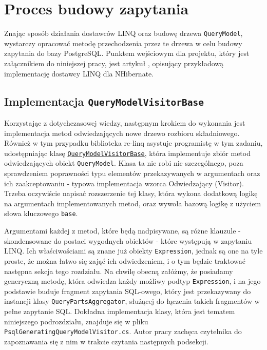 \chapter{Proces budowy zapytania}
Znając sposób działania dostawców LINQ oraz budowę drzewa \texttt{QueryModel}, wystarczy opracować metodę przechodzenia przez te drzewa w celu budowy zapytania do bazy PostgreSQL. Punktem wejściowym dla projektu, który jest załącznikiem do niniejszej pracy, jest artykuł \cite{codeproject_nhibernate}, opisujący przykładową implementację dostawcy LINQ dla NHibernate.

\section{Implementacja \texttt{QueryModelVisitorBase}}
Korzystając z dotychczasowej wiedzy, następnym krokiem do wykonania jest implementacja metod odwiedzających nowe drzewo rozbioru składniowego. Również w tym przypadku biblioteka re-linq asystuje programistę w tym zadaniu, udostępniając klasę \href{https://github.com/re-motion/Relinq/blob/ab11f0997998a90e17e90dc58b215c3997d47311/Core/QueryModelVisitorBase.cs}{\texttt{QueryModelVisitorBase}}, która implementuje zbiór metod odwiedzających obiekt \texttt{QueryModel}. Klasa ta nie robi nic szczególnego, poza sprawdzeniem poprawności typu elementów przekazywanych w argumentach oraz ich zaakceptowaniu - typowa implementacja wzorca Odwiedzający (Visitor). Trzeba oczywiście napisać rozszerzenie tej klasy, która wykona dodatkową logikę na argumentach implementowanych metod, oraz wywoła bazową logikę z użyciem słowa kluczowego \texttt{base}.

Argumentami każdej z metod, które będą nadpisywane, są różne klauzule - skondensowane do postaci wygodnych obiektów - które występują w zapytaniu LINQ. Ich właściwościami są znane już obiekty \texttt{Expression}, jednak są one na tyle proste, że można łatwo się zająć ich odwiedzeniem, i o tym będzie traktować następna sekcja tego rozdziału. Na chwilę obecną załóżmy, że posiadamy generyczną metodę, która odwiedza każdy możliwy podtyp \texttt{Expression}, i na jego podstawie buduje fragment zapytania SQL-owego, który jest przekazywany do instancji klasy \texttt{QueryPartsAggregator}, służącej do łączenia takich fragmentów w pełne zapytanie SQL. Dokładna implementacja klasy, która jest tematem niniejszego podrozdziału, znajduje się w pliku \texttt{PsqlGeneratingQueryModelVisitor.cs}. Autor pracy zachęca czytelnika do zapoznawania się z nim w trakcie czytania następnych podsekcji.


